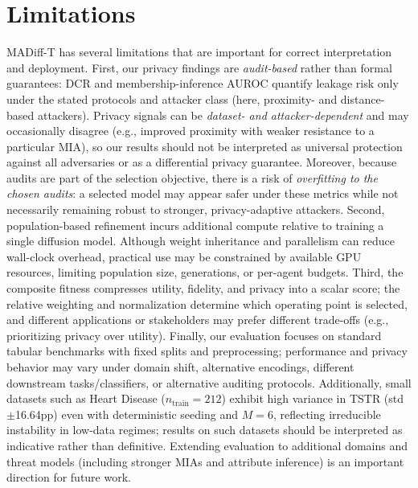 \documentclass[preprint,12pt]{elsarticle}
\begin{document}
\section{Limitations}
MADiff-T has several limitations that are important for correct interpretation and deployment. First, our privacy findings are \emph{audit-based} rather than formal guarantees: DCR and membership-inference AUROC quantify leakage risk only under the stated protocols and attacker class (here, proximity- and distance-based attackers). Privacy signals can be \emph{dataset- and attacker-dependent} and may occasionally disagree (e.g., improved proximity with weaker resistance to a particular MIA), so our results should not be interpreted as universal protection against all adversaries or as a differential privacy guarantee. Moreover, because audits are part of the selection objective, there is a risk of \emph{overfitting to the chosen audits}: a selected model may appear safer under these metrics while not necessarily remaining robust to stronger, privacy-adaptive attackers. Second, population-based refinement incurs additional compute relative to training a single diffusion model. Although weight inheritance and parallelism can reduce wall-clock overhead, practical use may be constrained by available GPU resources, limiting population size, generations, or per-agent budgets. Third, the composite fitness compresses utility, fidelity, and privacy into a scalar score; the relative weighting and normalization determine which operating point is selected, and different applications or stakeholders may prefer different trade-offs (e.g., prioritizing privacy over utility). Finally, our evaluation focuses on standard tabular benchmarks with fixed splits and preprocessing; performance and privacy behavior may vary under domain shift, alternative encodings, different downstream tasks/classifiers, or alternative auditing protocols. 
Additionally, small datasets such as Heart Disease 
($n_{\text{train}}=212$) exhibit high variance in TSTR 
(std $\pm$16.64pp) even with deterministic seeding and 
$M=6$, reflecting irreducible instability in low-data 
regimes; results on such datasets should be interpreted 
as indicative rather than definitive. Extending evaluation to additional domains and threat models (including stronger MIAs and attribute inference) is an important direction for future work.
\end{document}
